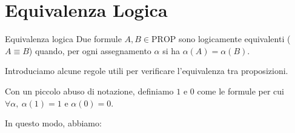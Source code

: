 \documentclass[a4paper,11pt]{report}
\begin{document}
\section{Equivalenza Logica}

\begin{defbox}[colframe=PineGreen, colback=DeepGreenLight]{Equivalenza logica}{}
    Due formule \( A, B \in \text{PROP} \) sono logicamente equivalenti (\( A \equiv B \)) quando, per ogni assegnamento \( \alpha \) si ha \( \alpha(A) = \alpha(B) \).
\end{defbox}


Introduciamo alcune regole utili per verificare l'equivalenza tra proposizioni.

Con un piccolo abuso di notazione, definiamo \( 1 \) e \( 0 \) come le formule per cui \( \forall \alpha, \ \alpha(1)= 1 \) e \( \alpha(0) = 0 \).

In questo modo, abbiamo:
\end{document}
